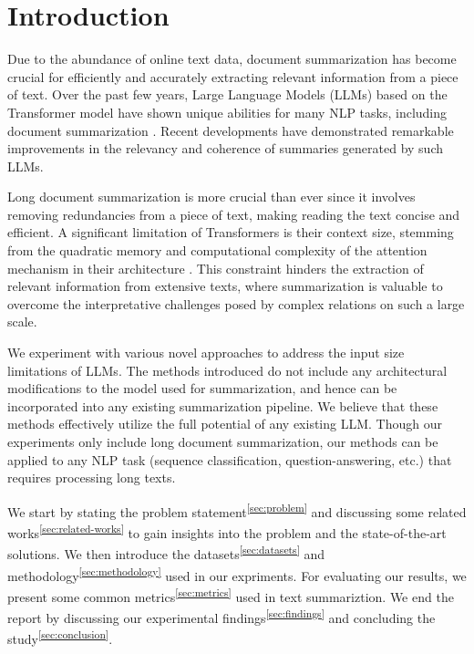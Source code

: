 \section{Introduction}
\label{sec:introduction}

Due to the abundance of online text data, document summarization has become crucial
for efficiently and accurately extracting relevant information from a piece of text.
Over the past few years, Large Language Models (LLMs) based on the Transformer model
\cite{vaswani2017attention} have shown unique abilities for many NLP tasks, including
document summarization \cite{yadav2023state}.
Recent developments have demonstrated remarkable improvements in the relevancy and
coherence of summaries generated by such LLMs.

Long document summarization is more crucial than ever since it involves removing redundancies
from a piece of text, making reading the text concise and efficient.
A significant limitation of Transformers is their context size, stemming from the quadratic
memory and computational complexity of the attention mechanism in their architecture
\cite{du2023improving}.
This constraint hinders the extraction of relevant information from extensive texts, where
summarization is valuable to overcome the interpretative challenges posed by complex
relations on such a large scale.

We experiment with various novel approaches to address the input size limitations of LLMs.
The methods introduced do not include any architectural modifications to the model used for
summarization, and hence can be incorporated into any existing summarization pipeline.
We believe that these methods effectively utilize the full potential of any existing LLM.
Though our experiments only include long document summarization, our methods can be applied
to any NLP task (sequence classification, question-answering, etc.) that requires processing
long texts.

We start by stating the problem statement\textsuperscript{\ref{sec:problem}} and discussing
some related works\textsuperscript{\ref{sec:related-works}} to gain insights into the problem
and the state-of-the-art solutions.
We then introduce the datasets\textsuperscript{\ref{sec:datasets}} and
methodology\textsuperscript{\ref{sec:methodology}} used in our expriments.
For evaluating our results, we present some common metrics\textsuperscript{\ref{sec:metrics}}
used in text summariztion.
We end the report by discussing our experimental findings\textsuperscript{\ref{sec:findings}}
and concluding the study\textsuperscript{\ref{sec:conclusion}}.
